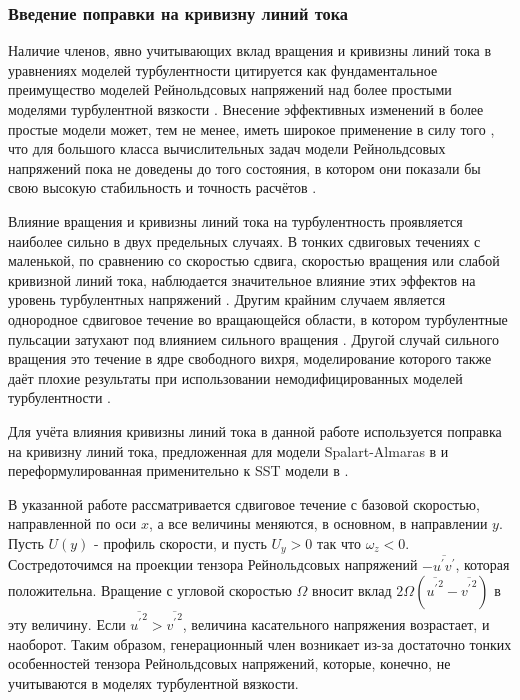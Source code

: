 	\subsubsection{Введение поправки на кривизну линий тока}
		\label{CC}
		Наличие членов, явно учитывающих вклад вращения и кривизны линий тока в уравнениях моделей турбулентности цитируется как фундаментальное преимущество моделей Рейнольдсовых напряжений над более простыми моделями турбулентной вязкости \cite{ShurSpallart}. Внесение эффективных изменений в более простые модели может, тем не менее, иметь широкое применение в силу того \cite{CC2}, что для большого класса вычислительных задач модели Рейнольдсовых напряжений пока не доведены до того состояния, в котором они показали бы свою высокую стабильность и точность расчётов \cite{CC3}.
		
		Влияние вращения и кривизны линий тока на турбулентность проявляется наиболее сильно в двух предельных случаях. В тонких сдвиговых течениях с маленькой, по сравнению со скоростью сдвига, скоростью вращения или слабой кривизной линий тока, наблюдается значительное влияние этих эффектов на уровень турбулентных напряжений \cite{Bradshaw}. Другим крайним случаем является однородное сдвиговое течение во вращающейся области, в котором турбулентные пульсации затухают под влиянием сильного вращения \cite{Speziale}. Другой случай сильного вращения это течение в ядре свободного вихря, моделирование которого также даёт плохие результаты при использовании немодифицированных моделей турбулентности \cite{Govindaraju}.
		
		Для учёта влияния кривизны линий тока в данной работе используется поправка на кривизну линий тока, предложенная для модели Spalart-Almaras в \cite{ShurSpallart} и переформулированная применительно к SST модели в \cite{Smirnov}.
		
		В указанной работе рассматривается сдвиговое течение с базовой скоростью, направленной по оси $x$, а все величины меняются, в основном, в направлении $y$. Пусть $U(y)$ - профиль скорости, и пусть $U_y > 0$ так что $\omega_z < 0$. Состредоточимся на проекции тензора Рейнольдсовых напряжений $-\overline{u^{'}v^{'}}$, которая положительна. Вращение с угловой скоростью $\Omega$ вносит вклад $2\Omega(\overline{{u^{'}}^2}-\overline{{v^{'}}^2})$ в эту величину. Если $\overline{{u^{'}}^2} > \overline{{v^{'}}^2}$, величина касательного напряжения возрастает, и наоборот. Таким образом, генерационный член возникает из-за достаточно тонких особенностей тензора Рейнольдсовых напряжений, которые, конечно, не учитываются в моделях турбулентной вязкости.
		

